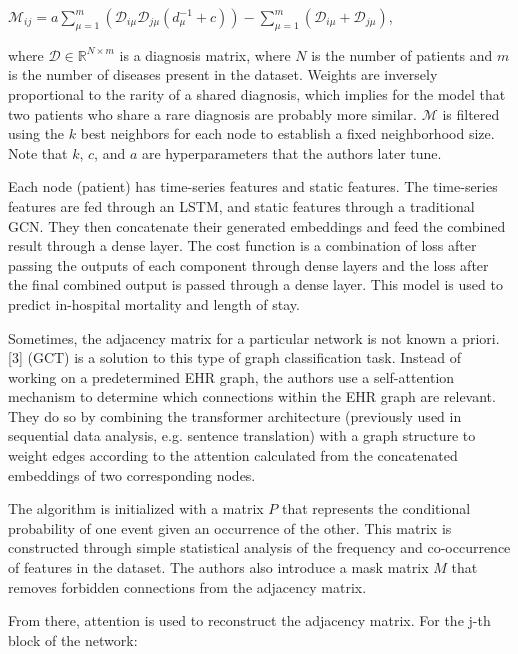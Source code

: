 \documentclass{article}
\begin{document}
\begin{center}
$\mathcal{M}_{ij} = a \sum\limits_{\mu = 1}^m (\mathcal{D}_{i\mu}\mathcal{D}_{j\mu}(d_\mu^{-1} + c)) - \sum\limits_{\mu = 1}^m(\mathcal{D}_{i\mu} + \mathcal{D}_{j\mu})$, \end{center}

 where $\mathcal{D} \in \mathbb{R}^{N \times m}$ is a diagnosis matrix, where $N$ is the number of patients and $m $ is the number of diseases present in the dataset. Weights are inversely proportional to the rarity of a shared diagnosis, which implies for the model that two patients who share a rare diagnosis are probably more similar. $\mathcal{M}$ is filtered using the $k$ best neighbors for each node to establish a fixed neighborhood size. Note that $k$, $c$, and $a$ are hyperparameters that the authors later tune. 

Each node (patient) has time-series features and static features. The time-series features are fed through an LSTM, and static features through a traditional GCN. They then concatenate their generated embeddings and feed the combined result through a dense layer. The cost function is a combination of loss after passing the outputs of each component through dense layers and the loss after the final combined output is passed through a dense layer. This model is used to predict in-hospital mortality and length of stay. 

Sometimes, the adjacency matrix for a particular network is not known a priori. 
[3] (GCT) is a solution to this type of graph classification task. Instead of working on a predetermined EHR graph, the authors use a self-attention mechanism to determine which connections within the EHR graph are relevant. They do so by combining the transformer architecture (previously used in sequential data analysis, e.g. sentence translation) with a graph structure to weight edges according to the attention calculated from the concatenated embeddings of two corresponding nodes. 

The algorithm is initialized with a matrix $P$ that represents the conditional probability of one event given an occurrence of the other. This matrix is constructed through simple statistical analysis of the frequency and co-occurrence of features in the dataset. The authors also introduce a mask matrix $M$ that removes forbidden connections from the adjacency matrix. 

From there, attention is used to reconstruct the adjacency matrix. For the j-th block of the network:
\end{document}
